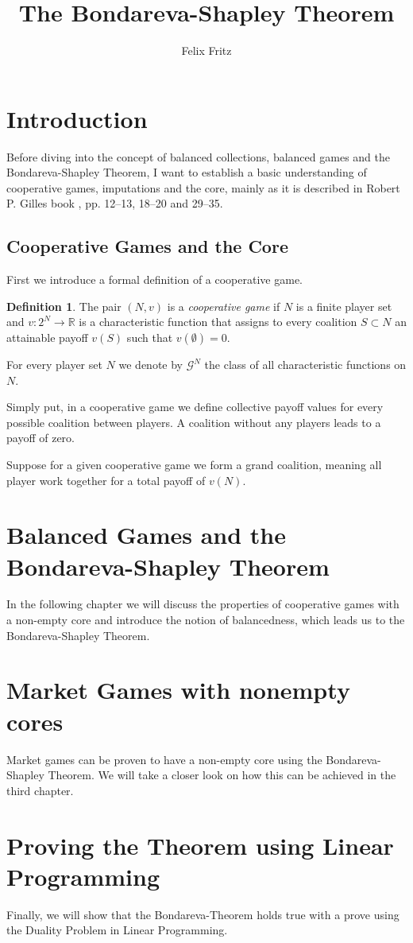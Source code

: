 \documentclass[10pt,a4paper,titlepage]{article}
\author{Felix Fritz}
\title{The Bondareva-Shapley Theorem}
\theoremstyle{plain}
\theoremstyle{definition}
\newtheorem{defn}[thm]{Definition} %
\begin{document}
\maketitle

\tableofcontents
\pagebreak

\section{Introduction}
 Before diving into the concept of balanced collections, balanced games and the Bondareva-Shapley Theorem, I want to establish a basic understanding of cooperative games, imputations and the core, mainly as it is described in Robert P. Gilles book \cite{gilles}, pp. 12--13, 18--20 and 29--35.

 \subsection{Cooperative Games and the Core}
 First we introduce a formal definition of a cooperative game.
\begin{defn}
    The pair $(N, v)$ is a \textit{cooperative game} if $N$ is a finite player set and $v: 2^N \rightarrow \mathbb{R}$ is a characteristic function that assigns to every coalition $S \subset N$ an attainable payoff $v(S)$ such that $v(\emptyset) = 0$.
    
    For every player set $N$ we denote by $\mathcal{G}^N$ the class of all characteristic functions on $N$.
\end{defn}
Simply put, in a cooperative game we define collective payoff values for every possible coalition between players. A coalition without any players leads to a payoff of zero.

Suppose for a given cooperative game we form a grand coalition, meaning all player work together for a total payoff of $v(N)$. 



 \section{Balanced Games and the Bondareva-Shapley Theorem}
 In the following chapter we will discuss the properties of cooperative games with a non-empty core and introduce the notion of balancedness, which leads us to the Bondareva-Shapley Theorem.

 \section{Market Games with nonempty cores}
 Market games can be proven to have a non-empty core using the Bondareva-Shapley Theorem. We will take a closer look on how this can be achieved in the third chapter.

 \section{Proving the Theorem using Linear Programming}
 Finally, we will show that the Bondareva-Theorem holds true with a prove using the Duality Problem in Linear Programming.
 
\pagebreak
 


\end{document}
